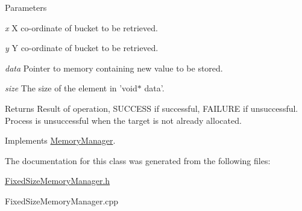 \begin{DoxyParams}{Parameters}
\item[{\em x}]X co-\/ordinate of bucket to be retrieved. \item[{\em y}]Y co-\/ordinate of bucket to be retrieved. \item[{\em data}]Pointer to memory containing new value to be stored. \item[{\em size}]The size of the element in 'void$\ast$ data'.\end{DoxyParams}
\begin{DoxyReturn}{Returns}
Result of operation, SUCCESS if successful, FAILURE if unsuccessful. Process is unsuccessful when the target is not already allocated. 
\end{DoxyReturn}


Implements \hyperlink{classMemoryManager_a53a7f4663f763985ce93f36d76d08370}{MemoryManager}.



The documentation for this class was generated from the following files:\begin{DoxyCompactItemize}
\item 
\hyperlink{FixedSizeMemoryManager_8h}{FixedSizeMemoryManager.h}\item 
FixedSizeMemoryManager.cpp\end{DoxyCompactItemize}
